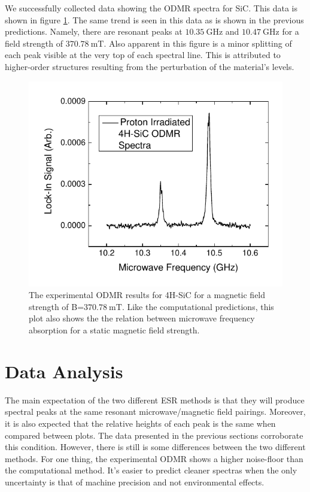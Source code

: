 \documentclass[oneside, noacknowlegments]{BYUPhys}
\begin{document}
We successfully collected data showing the ODMR spectra for SiC. This data is shown in figure \ref{fig:SiCResults}. The same trend is seen in this data as is shown in the previous predictions. Namely, there are resonant peaks at $10.35~\text{GHz}$ and $10.47~\text{GHz}$ for a field strength of $370.78~\text{mT}$. Also apparent in this figure is a minor splitting of each peak visible at the very top of each spectral line. This is attributed to higher-order structures resulting from the perturbation of the material's levels.

\begin{figure}
    \centerline{\includegraphics{p14-odmr}}
    \caption[Experimental ODMR for SiC]{\label{fig:SiCResults}
     The experimental ODMR results for 4H-SiC for a magnetic field strength of B=$370.78~\text{mT}$. Like the computational predictions, this plot also shows the the relation between microwave frequency absorption for a static magnetic field strength.}
 \end{figure}
 
\section{Data Analysis}

The main expectation of the two different ESR methods is that they will produce spectral peaks at the same resonant microwave/magnetic field pairings. Moreover, it is also expected that the relative heights of each peak is the same when compared between plots. The data presented in the previous sections corroborate this condition. However, there is still is some differences between the two different methods. For one thing, the experimental ODMR shows a higher noise-floor than the computational method. It's easier to predict cleaner spectras when the only uncertainty is that of machine precision and not environmental effects.
\end{document}
